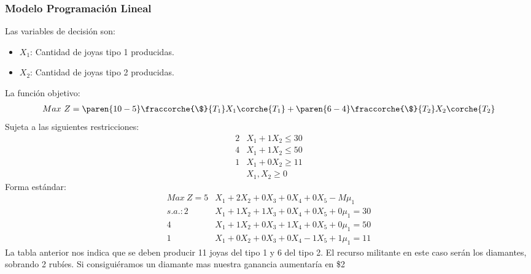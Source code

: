 

 
\begin{homeworkProblem}
\subsubsection{Modelo Programación Lineal}

Las variables de decisión son:
\begin{itemize}
    \item $X_1$: Cantidad de joyas tipo 1 producidas. \\
    \item $X_2$: Cantidad de joyas tipo 2 producidas. 
\end{itemize}
La función objetivo:
\begin{align*}
    Max\ Z = \paren{10-5}\fraccorche{\$}{T_1}X_1\corche{T_1} + \paren{6-4}\fraccorche{\$}{T_2}X_2\corche{T_2}
\end{align*}
Sujeta a las siguientes restricciones:
\begin{align*}
    2&X_1 + 1X_2 \le 30 \\
    4&X_1 + 1X_2 \le 50 \\
    1&X_1 + 0X_2 \ge 11 \\
    &X_1,X_2 \ge 0
\end{align*}
Forma estándar:
\begin{align*}
    Max\ Z = 5&X_1 + 2X_2 + 0X_3 + 0X_4 + 0X_5 - M\mu_1 \\
    s.a.: 2&X_1 + 1X_2 + 1X_3 + 0X_4 + 0X_5 + 0\mu_1 = 30 \\
          4&X_1 + 1X_2 + 0X_3 + 1X_4 + 0X_5 + 0\mu_1 = 50 \\
          1&X_1 + 0X_2 + 0X_3 + 0X_4 - 1X_5 + 1\mu_1 = 11
\end{align*}
La tabla anterior nos indica que se deben producir 11 joyas del tipo 1 y 6 del tipo 2. El recurso militante en este caso serán los diamantes, sobrando 2 rubíes. Si consiguiéramos un diamante mas nuestra ganancia aumentaría en \$2

\end{homeworkProblem}
